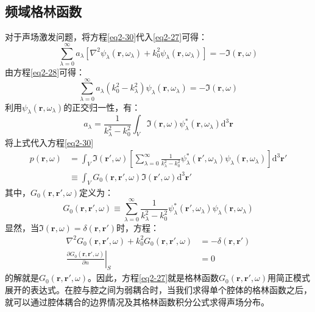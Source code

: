 \subsection{频域格林函数}
对于声场激发问题，将方程\ref{eq2-30}代入\ref{eq2-27}可得：
\begin{equation}\label{eq2-32}
  \sum_{\lambda = 0}^{\infty}a_{\lambda}[\nabla^{2}\psi_{\lambda}(\mathbf{r},\omega_{\lambda}) + k_{0}^{2}\psi_{\lambda}(\mathbf{r},\omega_{\lambda})]=-\mathfrak{I}(\mathbf{r},\omega)
\end{equation}
由方程\ref{eq2-28}可得：
\begin{equation}\label{eq2-33}
  \sum_{\lambda = 0}^{\infty}a_{\lambda}(k_{0}^{2}-k_{\lambda}^{2})\psi_{\lambda}(\mathbf{r},\omega_{\lambda})=-\mathfrak{I}(\mathbf{r},\omega)
\end{equation}
利用$\psi_{\lambda}(\mathbf{r},\omega_{\lambda})$的正交归一性，有：
\begin{equation}\label{eq2-34}
  a_{\lambda}=\frac{1}{k_{\lambda}^{2}-k_{0}^{2}}\int_{V}\mathfrak{I}(\mathbf{r},\omega)\psi_{\lambda}^{*}(\mathbf{r},\omega_{\lambda})\mathrm{d}^{3}\mathbf{r}
\end{equation}
将上式代入方程\ref{eq2-30}
\begin{equation}
\begin{split}
  p(\mathbf{r},\omega)&=\int_{V}\mathfrak{I}(\mathbf{r}',\omega)\left[\sum_{\lambda = 0}^{\infty}\frac{1}{k_{\lambda}^{2}-k_{0}^{2}}\psi_{\lambda}^{*}(\mathbf{r}',\omega_{\lambda})\psi_{\lambda}(\mathbf{r},\omega_{\lambda})\right]\mathrm{d}^{3}\mathbf{r}'\\
  &\equiv\int_{V}G_{0}(\mathbf{r},\mathbf{r}',\omega)\mathfrak{I}(\mathbf{r}',\omega)\mathrm{d}^{3}\mathbf{r}'
\end{split}
\end{equation}
其中，$G_0(\mathbf{r}, \mathbf{r}', \omega)$定义为：
\begin{equation}
  G_0(\mathbf{r}, \mathbf{r}', \omega) \equiv \sum_{\lambda = 0}^{\infty} \frac{1}{k_{\lambda}^{2} - k_{0}^{2}} \psi_{\lambda}^{*}(\mathbf{r}', \omega_{\lambda}) \psi_{\lambda}(\mathbf{r}, \omega_{\lambda})
\end{equation}
显然，当$\mathfrak{I}(\mathbf{r}, \omega) = \delta(\mathbf{r}, \mathbf{r}')$时，方程：
\begin{equation}\label{eq2-27}
  \begin{split}
  \nabla^{2}G_{0}(\mathbf{r},\mathbf{r}',\omega)+k_{0}^{2}G_{0}(\mathbf{r},\mathbf{r}',\omega)&=-\delta(\mathbf{r},\mathbf{r}')\\
  \left.\frac{\partial G_{0}(\mathbf{r},\mathbf{r}',\omega)}{\partial n}\right|_{S}&=0
  \end{split}
\end{equation}
的解就是$G_0(\mathbf{r}, \mathbf{r}', \omega)$。因此，方程\ref{eq2-27}就是格林函数$G_0(\mathbf{r}, \mathbf{r}', \omega)$用简正模式展开的表达式。在腔与腔之间为弱耦合时，当我们求得单个腔体的格林函数之后，就可以通过腔体耦合的边界情况及其格林函数积分公式求得声场分布。

